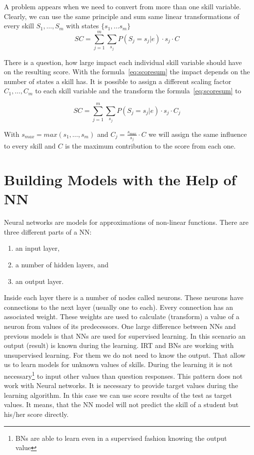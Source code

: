 A problem appears when we need to convert from more than one skill variable. Clearly, we can use the same principle and sum same linear transformations of every skill $S_1,\ldots, S_m$ with states $\{s_1,\ldots s_m\}$
\begin{equation}
SC = \sum_{j=1}^m{\sum_{s_j}}{P(S_j=s_j|e)\cdot s_j\cdot C}
\label{eq:scoresum}
\end{equation}

There is a question, how large impact each individual skill variable should have on the resulting score. With the formula~\ref{eq:scoresum} the impact depends on the number of states a skill has. It is possible to assign a different scaling factor $C_1,\ldots, C_m$ to each skill variable and the transform the formula~\ref{eq:scoresum} to

\begin{equation}
SC = \sum_{j=1}^m{\sum_{s_j}}{P(S_j=s_j|e)\cdot s_j\cdot C_j} 
\label{eq:scoresum2}
\end{equation}

With $s_{max} = max(s_1,\ldots, s_m)$ and $C_j = \frac{s_{max}}{s_j}\cdot C$ we will assign the same influence to every skill and $C$ is the maximum contribution to the score from each one.

\section{Building Models with the Help of NN}
Neural networks are models for approximations of non-linear functions. There are three different parts of a NN:
\begin{enumerate}
	\item an input layer,
	\item a number of hidden layers, and
	\item an output layer.
\end{enumerate}
Inside each layer there is a number of nodes called neurons. These neurons have connections to the next layer (usually one to each). Every connection has an associated weight. These weights are used to calculate (transform) a value of a neuron from values of its predecessors. One large difference between NNs and previous models is that NNs are used for supervised learning. In this scenario an output (result) is known during the learning. IRT and BNs are working with unsupervised learning. For them we do not need to know the output. That allow us to learn models for unknown values of skills. During the learning it is not necessary\footnote{BNs are able to learn even in a supervised fashion knowing the output value} to input other values than question responses. This pattern does not work with Neural networks. It is necessary to provide target values during the learning algorithm. In this case we can use score results of the test as target values. It means, that the NN model will not predict the skill of a student but his/her score directly.


